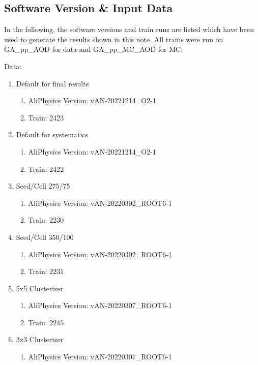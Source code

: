 \documentclass[ALICE]{ALICE_analysis_notes}
\begin{document}
\begin{appendix}

\clearpage{}\section{Software Version \& Input Data}
\label{sec:software}
In the following, the software versions and train runs are listed which have been used to generate the results shown in this note. All trains were run on GA\_pp\_AOD for data and GA\_pp\_MC\_AOD for MC:

Data:
\begin{enumerate}
    \item Default for final results
    \begin{enumerate}
        \item AliPhysics Version: vAN-20221214\_O2-1
        \item Train: 2423
    \end{enumerate}
    \item Default for systematics
    \begin{enumerate}
        \item AliPhysics Version: vAN-20221214\_O2-1
        \item Train: 2422
    \end{enumerate}
    \item Seed/Cell 275/75
    \begin{enumerate}
        \item AliPhysics Version: vAN-20220302\_ROOT6-1
        \item Train: 2230
    \end{enumerate}
    \item Seed/Cell 350/100
    \begin{enumerate}
        \item AliPhysics Version: vAN-20220302\_ROOT6-1
        \item Train: 2231
    \end{enumerate}
    \item 5x5 Clusterizer
    \begin{enumerate}
        \item AliPhysics Version: vAN-20220307\_ROOT6-1
        \item Train: 2245
    \end{enumerate}
    \item 3x3 Clusterizer
    \begin{enumerate}
        \item AliPhysics Version: vAN-20220307\_ROOT6-1

\end{enumerate}
\end{enumerate}
\end{appendix}
\end{document}
